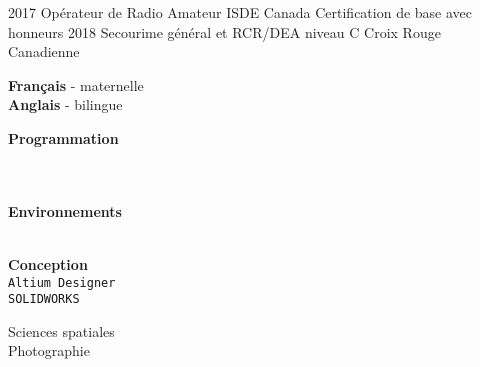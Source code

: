\documentclass[9pt]{developercv} %
\begin{document}
\begin{minipage}[t]{0.8\textwidth}


\begin{entrylist}
	\entry
		{2017}
		{Opérateur de Radio Amateur}
		{ISDE Canada}
		{
			Certification de base avec honneurs
		}
	\entry
		{2018}
		{Secourime général et RCR/DEA niveau C}
		{Croix Rouge Canadienne}
		{\vspace{-14pt}}
\end{entrylist}
\end{minipage}
\begin{minipage}[t]{0.02\textwidth}
	\hfill
\end{minipage}
\begin{minipage}[t]{0.18\textwidth}
		\textbf{Français} - maternelle\\
		\textbf{Anglais} - bilingue

		\textbf{Programmation}
		\begin{barchart}{1.75}
		\end{barchart}
		\\\\
		\textbf{Environnements}
		\begin{barchart}{1.75}
		\end{barchart}
		\\
		\textbf{Conception}\\
		\texttt{Altium Designer}\\
		\texttt{SOLIDWORKS}

		Sciences spatiales\\
		Photographie

\end{minipage}

\end{document}
